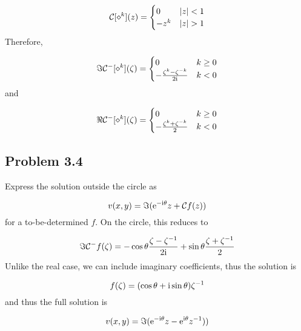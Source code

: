 \documentclass[12pt,a4paper]{article}
\def\I{ {\rm i} }
\def\E{ {\rm e} }
\def\CC{ {\cal C} }
\begin{document}
\[
\CC[\diamond^k](z) =\begin{cases}
0  & |z| < 1 \\
    -z^k & |z| > 1
        \end{cases}
\]
Therefore,

\[
\Im \CC^-[\diamond^k](\zeta) =\begin{cases}
0  & k \geq 0 \\
    -{\zeta^k - \zeta^{-k} \over 2 \I} & k < 0
        \end{cases}
\]
and

\[
\Re \CC^-[\diamond^k](\zeta) =\begin{cases}
0  & k \geq 0 \\
    -{\zeta^k + \zeta^{-k} \over 2} & k < 0
        \end{cases}
\]
\subsection{Problem 3.4}
Express the solution outside the circle as

\[
v(x,y) = \Im ( \E^{-\I \theta} z + \CC f(z))
\]
for a to-be-determined $f$. On the circle, this reduces to

\[
\Im \CC^- f(\zeta) = -\cos \theta {\zeta - \zeta^{-1} \over 2 \I}  + \sin \theta {\zeta + \zeta^{-1} \over 2}
\]
Unlike the real case, we can include imaginary coefficients, thus the solution is

\[
f(\zeta) = (\cos \theta + \I \sin \theta) \zeta^{-1}
\]
and thus the full solution is

\[
v(x,y) =  \Im ( \E^{-\I \theta} z - \E^{\I \theta}   z^{-1}))
\]
\end{document}
